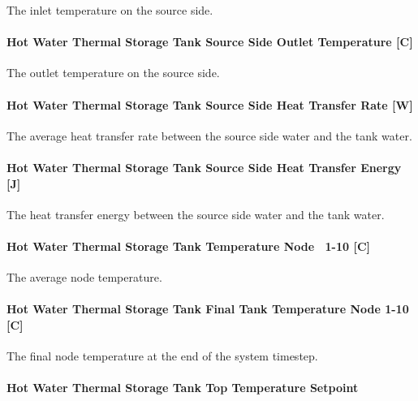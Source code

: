 The inlet temperature on the source side.

\paragraph{Hot Water Thermal Storage Tank Source Side Outlet Temperature
{[}C{]}}\label{hot-water-thermal-storage-source-side-outlet-temperature-thermalstoragehotwaterstratified}

The outlet temperature on the source side.

\paragraph{Hot Water Thermal Storage Tank Source Side Heat Transfer Rate
{[}W{]}}\label{hot-water-thermal-storage-source-side-heat-transfer-rate-thermalstoragehotwaterstratified}

The average heat transfer rate between the source side water and the tank water.

\paragraph{Hot Water Thermal Storage Tank Source Side Heat Transfer Energy
{[}J{]}}\label{hot-water-thermal-storage-source-side-heat-transfer-energy-thermalstoragehotwaterstratified}

The heat transfer energy between the source side water and the tank water.

\paragraph{Hot Water Thermal Storage Tank Temperature Node~ 1-10
{[}C{]}}\label{hot-water-thermal-storage-temperature-node-1-10-thermalstoragehotwaterstratified}

The average node temperature.

\paragraph{Hot Water Thermal Storage Tank Final Tank Temperature Node 1-10~
{[}C{]}}\label{hot-water-thermal-storage-final-temperature-node-1-10-thermalstoragehotwaterstratified}

The final node temperature at the end of the system timestep.

\paragraph{Hot Water Thermal Storage Tank Top Temperature Setpoint}\label{hot-water-thermal-storage-top-temperature-setpoint-thermalstoragehotwaterstratified}

